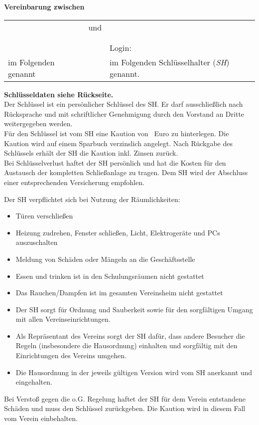 \begin{Form}
	{\centering
		\large
		\textbf{Vereinbarung zwischen}\\
	}
	\vspace{1em}
	\begin{tabu}{@{}XcX@{}}
		\bingoevNameLang & und & \ShVorname{} \ShName \\
		\bingoevAddrStrasse && \ShAddrStrasse \\
		\bingoevAddrStadt && \ShAddrStadt \\
											 && Login: \ShLogin \\
		im Folgenden \textit{\bingoevName} genannt && im Folgenden Schlüsselhalter (\textit{SH}) genannt.
	\end{tabu}
	
	\textbf{Schlüsseldaten siehe Rückseite.}\\
	
	Der Schlüssel ist ein persönlicher Schlüssel des SH. Er darf ausschließlich nach Rücksprache und mit schriftlicher Genehmigung durch den Vorstand an Dritte weitergegeben werden.\\
	
	Für den Schlüssel ist vom SH eine Kaution von \textbf{\ShKaution}\, Euro zu hinterlegen. Die Kaution wird auf einem Sparbuch verzinslich angelegt. Nach Rückgabe des Schlüssels erhält der SH die Kaution inkl. Zinsen zurück.\\
	
	Bei Schlüsselverlust haftet der SH persönlich und hat die Kosten für den Austausch der kompletten Schließanlage zu tragen. Dem SH wird der Abschluss einer entsprechenden Versicherung empfohlen.
	
	Der SH verpflichtet sich bei Nutzung der Räumlichkeiten:
	\begin{itemize}
		\setlength{\itemsep}{-5pt}
		\item Türen verschließen
		\item Heizung zudrehen, Fenster schließen, Licht, Elektrogeräte und PCs auszuschalten
		\item Meldung von Schäden oder Mängeln an die Geschäftsstelle
		\item Essen und trinken ist in den Schulungsräumen nicht gestattet
		\item Das Rauchen/Dampfen ist im gesamten Vereinsheim nicht gestattet
		\item Der SH sorgt für Ordnung und Sauberkeit sowie für den sorgfältigen Umgang mit allen Vereinseinrichtungen.
		\item Als Repräsentant des Vereins sorgt der SH dafür, dass andere Besucher die Regeln (insbesondere die Hausordnung) einhalten und sorgfältig mit den Einrichtungen des Vereins umgehen.
		\item Die Hausordnung in der jeweils gültigen Version wird vom SH anerkannt und eingehalten.
	\end{itemize}
	Bei Verstoß gegen die o.G. Regelung haftet der SH für dem Verein entstandene Schäden und muss den Schlüssel zurückgeben. Die Kaution wird in diesem Fall vom Verein einbehalten.\\
	

\end{Form}
